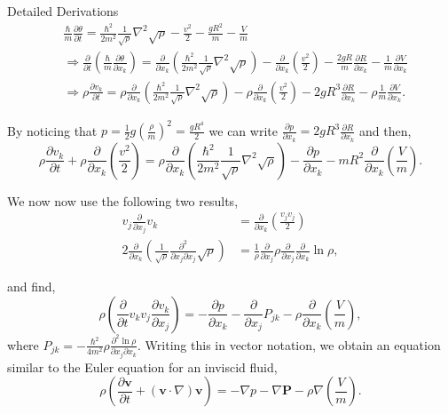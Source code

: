 \begin{chapter}{Detailed Derivations\label{app:App2}}
\begin{align*}
&\frac{\hbar}{m} \frac{\partial \theta}{\partial t} = \frac{\hbar^2}{2m^2} \frac{1}{\sqrt{\rho}} \nabla^2\sqrt{\rho} - \frac{v^2}{2} - \frac{gR^2}{m} - \frac{V}{m}\\
&\Rightarrow \frac{\partial}{\partial t}\left(\frac{\hbar}{m} \frac{\partial \theta}{\partial x_k}\right) = \frac{\partial}{\partial x_k}\left(\frac{\hbar^2}{2m^2} \frac{1}{\sqrt{\rho}} \nabla^2\sqrt{\rho} \right)- \frac{\partial}{\partial x_k} \left (\frac{v^2}{2}\right) - \frac{2gR}{m}\frac{\partial R}{\partial x_k} - \frac{1}{m}\frac{\partial V}{\partial x_k}\\
&\Rightarrow \rho\frac{\partial v_k}{\partial t} =\rho \frac{\partial}{\partial x_k}\left(\frac{\hbar^2}{2m^2} \frac{1}{\sqrt{\rho}} \nabla^2\sqrt{\rho} \right)- \rho\frac{\partial}{\partial x_k} \left (\frac{v^2}{2}\right) - 2gR^3\frac{\partial R}{\partial x_k} - \rho\frac{1}{m}\frac{\partial V}{\partial x_k}.
\end{align*}

By noticing that $p = \frac{1}{2}g \left ( \frac{\rho}{m} \right ) ^2 = \frac{gR^4}{2}$ we can write $\frac{\partial p}{\partial x_k} = 2gR^3\frac{\partial R}{\partial x_k}$ and then,
\begin{equation*}
\rho\frac{\partial v_k}{\partial t} + \rho\frac{\partial}{\partial x_k} \left (\frac{v^2}{2}\right) =\rho \frac{\partial}{\partial x_k}\left(\frac{\hbar^2}{2m^2} \frac{1}{\sqrt{\rho}} \nabla^2\sqrt{\rho} \right) - \frac{\partial p}{\partial x_k} - mR^2\frac{\partial}{\partial x_k}\left ( \frac{V}{m}\right ).
\end{equation*}

We now now use the following two results,
\begin{align*}
v_j \frac{\partial}{\partial x_j}v_k &= \frac{\partial}{\partial x_k}\left ( \frac{v_jv_j}{2}\right )\\
2\frac{\partial}{\partial x_k}\left( \frac{1}{\sqrt{\rho}} \frac{\partial^2}{\partial x_j \partial x_j} \sqrt{\rho}\right) &= \frac{1}{\rho} \frac{\partial}{\partial x_j}\rho \frac{\partial}{\partial x_j}\frac{\partial}{\partial x_k} \ln{\rho},
\end{align*}

and find,
\begin{equation*}
\rho\left ( \frac{\partial}{\partial t} v_k v_j\frac{\partial v_k}{\partial x_j}\right) = -\frac{\partial p}{\partial x_k} - \frac{\partial}{\partial x_j} P_{jk} - \rho \frac{\partial}{\partial x_k}\left( \frac{V}{m} \right),
\end{equation*}
where $P_{jk} = -\frac{\hbar^2}{4m^2}\rho\frac{\partial^2\ln{\rho}}{\partial x_j \partial x_k}$. Writing this in vector notation, we obtain an equation similar to the Euler equation for an inviscid fluid,
\begin{equation}
\rho\left( \frac{\partial \mathbf{v}}{\partial t} + \left( \mathbf{v} \cdot \nabla \right)\mathbf{v} \right) = -\nabla p - \nabla \mathbf{P} - \rho \nabla \left(\frac{V}{m}\right).
\end{equation}

\end{chapter}

